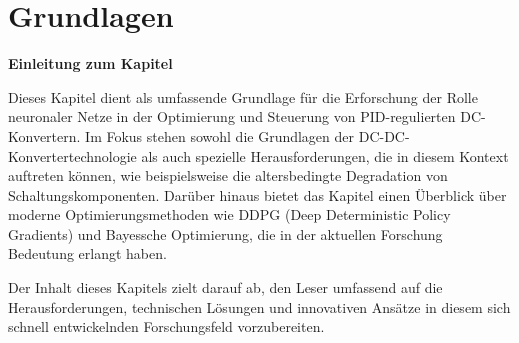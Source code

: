 \chapter{Grundlagen}




\textbf{Einleitung zum Kapitel}

Dieses Kapitel dient als umfassende Grundlage für die Erforschung der Rolle neuronaler Netze in der Optimierung und Steuerung von PID-regulierten DC-Konvertern. Im Fokus stehen sowohl die Grundlagen der DC-DC-Konvertertechnologie als auch spezielle Herausforderungen, die in diesem Kontext auftreten können, wie beispielsweise die altersbedingte Degradation von Schaltungskomponenten. Darüber hinaus bietet das Kapitel einen Überblick über moderne Optimierungsmethoden wie DDPG (Deep Deterministic Policy Gradients) und Bayessche Optimierung, die in der aktuellen Forschung Bedeutung erlangt haben.

Der Inhalt dieses Kapitels zielt darauf ab, den Leser umfassend auf die Herausforderungen, technischen Lösungen und innovativen Ansätze in diesem sich schnell entwickelnden Forschungsfeld vorzubereiten.






%




